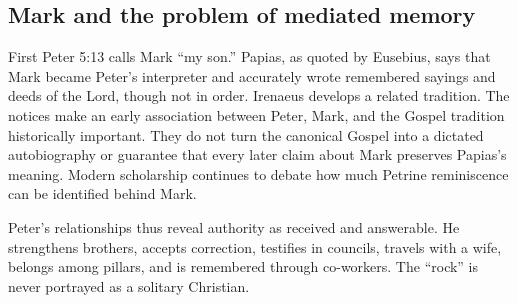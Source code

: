 \subsection{Mark and the problem of mediated memory}

First Peter 5:13 calls Mark ``my son.'' Papias, as quoted by Eusebius, says
that Mark became Peter's interpreter and accurately wrote remembered sayings
and deeds of the Lord, though not in order. Irenaeus develops a related
tradition. The notices make an early association between Peter, Mark, and the
Gospel tradition historically important. They do not turn the canonical
Gospel into a dictated autobiography or guarantee that every later claim
about Mark preserves Papias's meaning. Modern scholarship continues to debate
how much Petrine reminiscence can be identified behind Mark.

Peter's relationships thus reveal authority as received and answerable. He
strengthens brothers, accepts correction, testifies in councils, travels with
a wife, belongs among pillars, and is remembered through co-workers. The
``rock'' is never portrayed as a solitary Christian.
